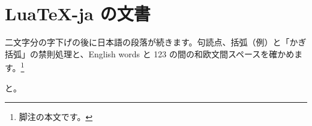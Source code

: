 \documentclass{ltjsarticle}
\begin{document}
\section{LuaTeX-ja の文書}

\noindent\hspace*{2\zw}二文字分の字下げの後に日本語の段落が続きます。句読点、括弧（例）と「かぎ括弧」の禁則処理と、English words と 123 の間の和欧文間スペースを確かめます。\footnote{脚注の本文です。}

と。
\end{document}
